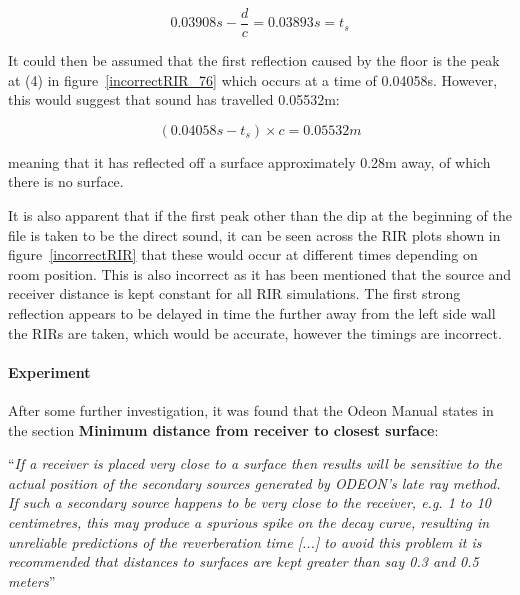 \documentclass[../../main.tex]{subfiles}
\begin{document}
			\begin{equation}
			0.03908s - \frac{d}{c} = 0.03893s = t_s
			\end{equation}

			It could then be assumed that the first reflection caused by the floor is the peak at (4) in figure~\ref{incorrectRIR_76} which occurs at a time of 0.04058s. However, this would suggest that sound has travelled 0.05532m:

			\begin{equation}
			(0.04058s - t_s)\times{c} = 0.05532m
			\end{equation}

			meaning that it has reflected off a surface approximately 0.28m away, of which there is no surface.

			It is also apparent that if the first peak other than the dip at the beginning of the file is taken to be the direct sound, it can be seen across the \ac{RIR} plots shown in figure~\ref{incorrectRIR} that these would occur at different times depending on room position. This is also incorrect as it has been mentioned that the source and receiver distance is kept constant for all \ac{RIR} simulations. The first strong reflection appears to be delayed in time the further away from the left side wall the RIRs are taken, which would be accurate, however the timings are incorrect.

			\paragraph{Experiment}
			After some further investigation, it was found that the Odeon Manual \cite{odeonManual} states in the section \textbf{Minimum distance from receiver to closest surface}:

			 \vspace{5mm}
			 \begin{center}
			 \begin{minipage}{0.75\textwidth}
			 ``\textit{If a receiver is placed very close to a surface then results will be sensitive to the actual position of the secondary sources generated by ODEON’s late ray method. If such a secondary source happens to be very close to the receiver, e.g. 1 to 10 centimetres, this may produce a spurious spike on the decay curve, resulting in unreliable predictions of the reverberation time [...] to avoid this problem it is recommended that distances to surfaces are kept greater than say 0.3 and 0.5 meters}''
			 \end{minipage}
			 \end{center}
			 \vspace{5mm}
\end{document}

